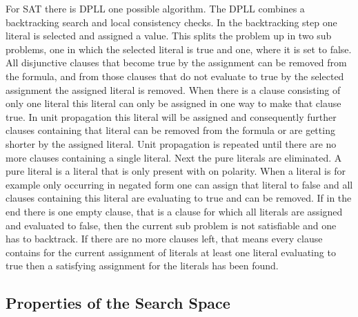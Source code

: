 For SAT there is DPLL \cite{DPLL} one possible algorithm. The DPLL combines a backtracking search and local consistency checks. In the backtracking step one literal is selected and assigned a value. This splits the problem up in two sub problems, one in which the selected literal is true and one, where it is set to false. All disjunctive clauses that become true by the assignment can be removed from the formula, and from those clauses that do not evaluate to true by the selected assignment the assigned literal is removed. When there is a clause consisting of only one literal this literal can only be assigned in one way to make that clause true. In unit propagation this literal will be assigned and consequently further clauses containing that literal can be removed from the formula or are getting shorter by the assigned literal. Unit propagation is repeated until there are no more clauses containing a single literal. Next the pure literals are eliminated. A pure literal is a literal that is only present with on polarity. When a literal is for example only occurring in negated form one can assign that literal to false and all clauses containing this literal are evaluating to true and can be removed. If in the end there is one empty clause, that is a clause for which all literals are assigned and evaluated to false, then the current sub problem is not satisfiable and one has to backtrack. If there are no more clauses left, that means every clause contains for the current assignment of literals at least one literal evaluating to true then a satisfying assignment for the literals has been found.
\subsection{Properties of the Search Space}

